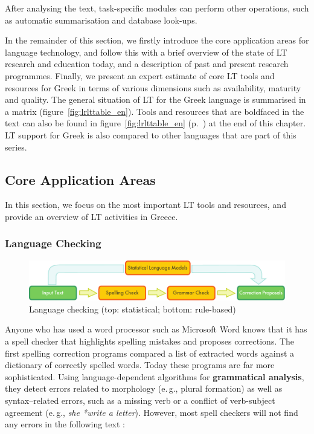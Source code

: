 \documentclass[]{../../metanetpaper}
\begin{document}
\begin{multicols}{2}
After analysing the text, task-specific modules can perform other operations, such as automatic summarisation and database look-ups.

In the remainder of this section, we firstly introduce the core application areas for language technology, and follow this with a brief overview of the state of LT research and education today, and a description of past and present research programmes. Finally, we present an expert estimate of core LT tools and resources for Greek in terms of various dimensions such as availability, maturity and quality. The general situation of LT for the Greek language is summarised in a matrix (figure~\ref{fig:lrlttable_en}). Tools and resources that are boldfaced in the text can also be found in figure~\ref{fig:lrlttable_en} (p.~\pageref{fig:lrlttable_en}) at the end of this chapter. LT support for Greek is also compared to other languages that are part of this series.

\subsection{Core Application Areas}

In this section, we focus on the most important LT tools and resources, and provide an overview of LT activities in Greece.

\subsubsection{Language Checking}

\begin{figure}[t]
  \center
  \includegraphics[width=\textwidth]{../_media/english/language_checking}
  \caption{Language checking (top: statistical; bottom: rule-based)}
  \label{fig:langcheckingaarch_en}
\end{figure}

Anyone who has used a word processor such as Microsoft Word knows that it has a spell checker that highlights spelling mistakes and proposes corrections. The first spelling correction programs compared a list of extracted words against a dictionary of correctly spelled words. Today these programs are far more sophisticated. Using language-dependent algorithms for \textbf{grammatical analysis}, they detect errors related to morphology (e.\,g., plural formation) as well as syntax–related errors, such as a missing verb or a conflict of verb-subject agreement (e.\,g., \textit{she *write a letter}). However, most spell checkers will not find any errors in the following text \cite{zar1}:


\end{multicols}
\end{document}

